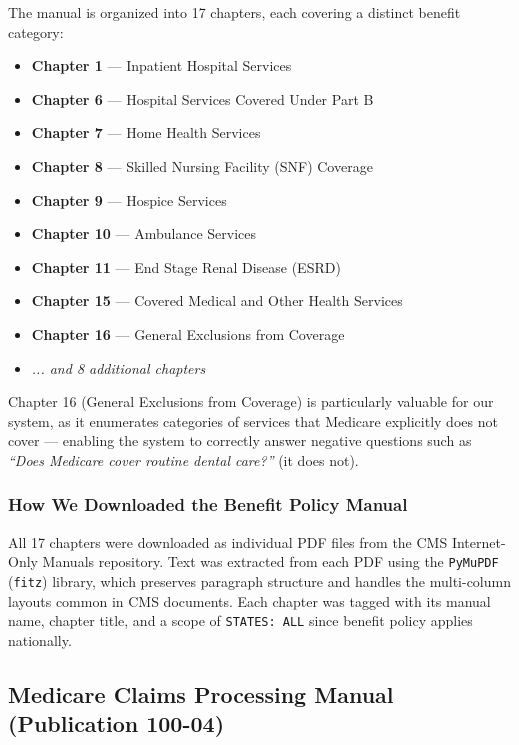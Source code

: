 \documentclass[12pt, letterpaper]{article}
\begin{document}
The manual is organized into 17 chapters, each covering a distinct benefit category:

\begin{itemize}[noitemsep, topsep=4pt]
    \item \textbf{Chapter 1} --- Inpatient Hospital Services
    \item \textbf{Chapter 6} --- Hospital Services Covered Under Part B
    \item \textbf{Chapter 7} --- Home Health Services
    \item \textbf{Chapter 8} --- Skilled Nursing Facility (SNF) Coverage
    \item \textbf{Chapter 9} --- Hospice Services
    \item \textbf{Chapter 10} --- Ambulance Services
    \item \textbf{Chapter 11} --- End Stage Renal Disease (ESRD)
    \item \textbf{Chapter 15} --- Covered Medical and Other Health Services
    \item \textbf{Chapter 16} --- General Exclusions from Coverage
    \item \textit{... and 8 additional chapters}
\end{itemize}

Chapter 16 (General Exclusions from Coverage) is particularly valuable for our system,
as it enumerates categories of services that Medicare explicitly does not cover ---
enabling the system to correctly answer negative questions such as \textit{``Does
Medicare cover routine dental care?''} (it does not).

\subsubsection{How We Downloaded the Benefit Policy Manual}

All 17 chapters were downloaded as individual PDF files from the CMS Internet-Only
Manuals repository. Text was extracted from each PDF using the \texttt{PyMuPDF}
(\texttt{fitz}) library, which preserves paragraph structure and handles the
multi-column layouts common in CMS documents. Each chapter was tagged with its
manual name, chapter title, and a scope of \texttt{STATES: ALL} since benefit policy
applies nationally.

\subsection{Medicare Claims Processing Manual (Publication 100-04)}
\end{document}
